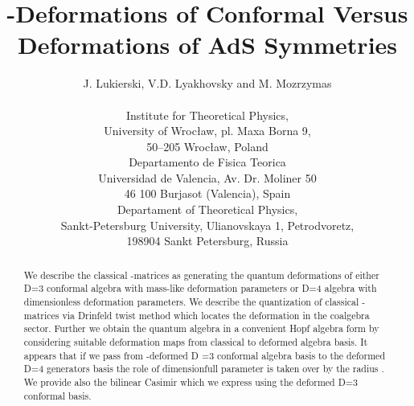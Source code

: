 \documentclass[a4paper,12pt,showkeys]{article}
\begin{document}
\renewcommand{\theequation}{\thesection.\arabic{equation}}

\title{\myHighlight{$\kappa$}\coordHE{}-Deformations of \coordHE{}  Conformal
Versus Deformations of  \coordHE{} AdS Symmetries}

\author{J. Lukierski\coordHE{}, V.D. Lyakhovsky\coordHE{}
 and M. Mozrzymas\coordHE{}
\\ \\
\coordHE{}Institute for Theoretical Physics, \\
 University of Wroc{\l}aw,
pl. Maxa Borna 9,                             \\
 50--205 Wroc{\l}aw, Poland
\\
\coordHE{}
Departamento de Fisica Teorica\\
Universidad de Valencia, Av. Dr. Moliner 50 \\
46 100 Burjasot (Valencia), Spain
\\  
\coordHE{}Departament of Theoretical Physics, \\
Sankt-Petersburg
University,
         Ulianovskaya 1, Petrodvoretz, \\
198904 Sankt Petersburg, Russia}

\date{}
\maketitle
\thispagestyle{empty}

\begin{abstract}
We describe the classical \coordHE{}  \coordHE{}-matrices as generating the
quantum
 deformations of either D=3 conformal algebra with mass-like deformation
parameters
 or D=4 \coordHE{} algebra with dimensionless  deformation parameters.
 We describe the quantization of classical \coordHE{}  \coordHE{}-matrices
   via Drinfeld twist
method which locates the deformation in the coalgebra sector.
 Further we obtain
  the quantum \coordHE{}  algebra
  in
  a convenient Hopf algebra form
 by considering suitable deformation maps from classical to deformed
  \coordHE{} algebra basis. It appears that
   if we pass from \myHighlight{$\kappa$}\coordHE{}-deformed D =3 conformal algebra basis to
   the deformed
      D=4 \coordHE{} generators
    basis
    the role
   of dimensionfull parameter  is taken over by the \coordHE{} radius \coordHE{}.
    We provide also
     the bilinear \coordHE{} Casimir  which we express using the
 deformed D=3 conformal  basis.
\end{abstract}
\end{document}
